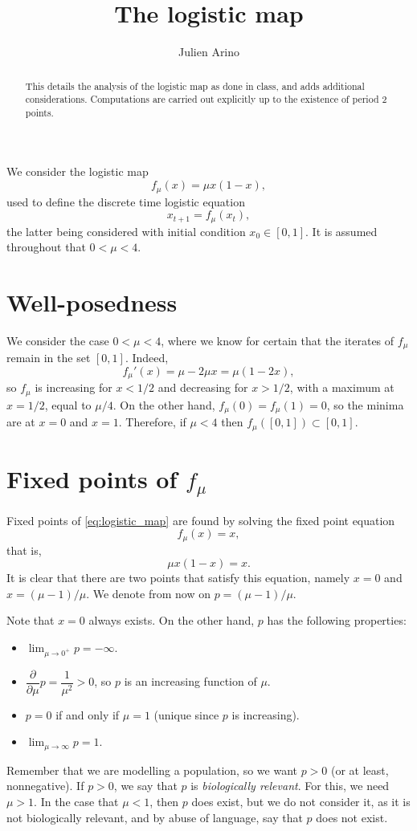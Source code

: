 \documentclass[12pt]{article}
\title{The logistic map}
\author{Julien Arino}
\theoremstyle{plain}
\begin{document}
\maketitle

\begin{abstract}
This details the analysis of the logistic map as done in class, and adds additional considerations. Computations are carried out explicitly up to the existence of period 2 points.
\end{abstract}

We consider the logistic map
\begin{equation}\label{eq:logistic_map}
f_\mu(x)=\mu x(1-x),
\end{equation}
used to define the discrete time logistic equation
\begin{equation}
x_{t+1}=f_\mu(x_t), \label{eq:logistic}
\end{equation}
the latter being considered with initial condition $x_0\in[0,1]$. It is assumed throughout that $0<\mu<4$.

\section{Well-posedness}
We consider the case $0<\mu<4$, where we know for certain that the iterates of $f_\mu$ remain in the set $[0,1]$. Indeed, 
\begin{equation}\label{eq:dlogistic_map}
f_\mu'(x)=\mu-2\mu x=\mu(1-2x),
\end{equation}
so $f_\mu$ is increasing for $x<1/2$ and decreasing for $x>1/2$, with a maximum at $x=1/2$, equal to $\mu/4$. On the other hand, $f_\mu(0)=f_\mu(1)=0$, so the minima are at $x=0$ and $x=1$. Therefore, if $\mu<4$ then $f_\mu([0,1])\subset[0,1]$.

\section{Fixed points of $f_\mu$}
Fixed points of \eqref{eq:logistic_map} are found by solving the fixed point equation
\[
f_\mu(x)=x,
\]
that is,
\[
\mu x(1-x)=x.
\]
It is clear that there are two points that satisfy this equation, namely $x=0$ and $x=(\mu-1)/\mu$. We denote from now on $p=(\mu-1)/\mu$.

Note that $x=0$ always exists. On the other hand, $p$ has the following properties:
\begin{itemize}
\item $\lim_{\mu\to 0^+}p=-\infty$.
\item $\dfrac{\partial}{\partial \mu}p=\dfrac{1}{\mu^2}>0$, so $p$ is an increasing function of $\mu$.
\item $p=0$ if and only if $\mu=1$ (unique since $p$ is increasing).
\item $\lim_{\mu\to\infty}p=1$.
\end{itemize}
Remember that we are modelling a population, so we want $p>0$ (or at least, nonnegative). If $p>0$, we say that $p$ is \emph{biologically relevant}. For this, we need $\mu>1$. In the case that $\mu<1$, then $p$ does exist, but we do not consider it, as it is not biologically relevant, and by abuse of language, say that $p$ does not exist.
\end{document}
